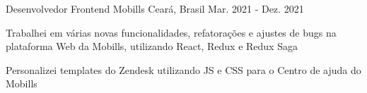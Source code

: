 \begin{cventries}
  \cventry
    {Desenvolvedor Frontend} %
    {Mobills} %
    {Ceará, Brasil} %
    {Mar. 2021 - Dez. 2021} %
    {
      \begin{cvitems} %
        \item {Trabalhei em várias novas
        funcionalidades, refatorações e
        ajustes de bugs na plataforma Web
        da Mobills, utilizando React,
        Redux e Redux Saga}
        \item {Personalizei templates do Zendesk
        utilizando JS e CSS para o Centro
        de ajuda do Mobills}
      \end{cvitems}
    }

\end{cventries}
